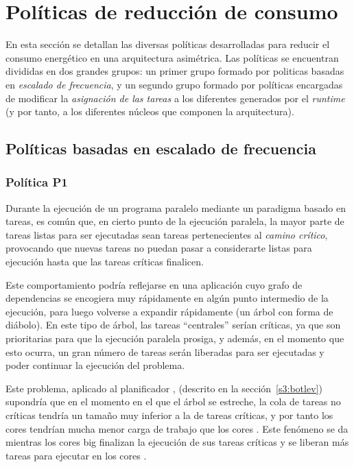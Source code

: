\section{Políticas de reducción de consumo}
En esta sección se detallan las diversas políticas desarrolladas para 
reducir el consumo energético en una arquitectura asimétrica. Las políticas
se encuentran divididas en dos grandes grupos: un primer grupo formado por
politicas basadas en {\em escalado de frecuencia}, y un segundo grupo formado por
políticas encargadas de modificar la {\em asignación de las tareas} a los
diferentes \wts generados por el \emph{runtime} (y por tanto, a los diferentes núcleos que
componen la arquitectura).

\subsection[{Políticas basadas en escalado de frecuencia (P1, P2, P2' y P3)}]{Políticas basadas en escalado de frecuencia}


\subsubsection{Política P1}

Durante la ejecución de un programa paralelo mediante un paradigma basado
en tareas, es común que, en cierto punto de la ejecución paralela,
la mayor parte de tareas listas para ser ejecutadas
sean tareas pertenecientes al {\em camino crítico}, provocando que nuevas tareas no puedan 
pasar a considerarte listas para ejecución hasta que las tareas críticas finalicen. 

Este comportamiento podría reflejarse en una aplicación cuyo grafo de
dependencias se encogiera muy rápidamente en algún punto intermedio de la
ejecución, para luego volverse a expandir rápidamente (un árbol con forma
de diábolo). En este tipo de árbol, las tareas ``centrales''
serían críticas, ya que son prioritarias para que la ejecución paralela
prosiga, y además, en el momento que esto ocurra, un gran
número de tareas serán liberadas para ser ejecutadas y
poder continuar la ejecución del problema.

Este problema, aplicado al planificador \botlev, (descrito en la
sección~\ref{s3:botlev}) supondría que en el momento en el que el árbol se
estreche, la cola de tareas no críticas tendría un tamaño muy inferior a la
de tareas críticas, y por tanto los cores \LITTLE tendrían mucha menor carga
de trabajo que los cores \BIG. Este fenómeno se da mientras los cores big
finalizan la ejecución de sus tareas críticas y se liberan más tareas para
ejecutar en los cores \LITTLE.

